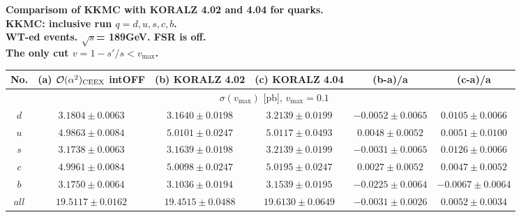 \documentclass[12pt,dvips]{article}
\begin{document}
\pagestyle{empty}
  
 
\noindent
{\Large\bf\color{red}
Comparisom of {\cal KK}MC with KORALZ 4.02 and 4.04 for quarks.}\\
{\large\bf\color{blue}
{\cal KK}MC: inclusive run $q=d,u,s,c,b$. \\
WT-ed events. $\sqrt{s}$= 189GeV. FSR is off.\\
The only cut $v=1-s'/s<v_{\max}$.
}
\vspace{10mm}

{\scriptsize
\noindent
\begin{tabular}                                                                                          {||c|c|c|c|c|c||}
\hline\hline
{\color{blue} No.}                                                              &
{\color{blue} (a) ${\cal O}(\alpha^2)_{\rm CEEX}$ intOFF}                       &
{\color{blue} (b) KORALZ 4.02 }                                                 &
{\color{blue} (c) KORALZ 4.04 }                                                 &
{\color{blue} (b-a)/a }                                                         &
{\color{blue} (c-a)/a }                                                         
\\
\hline
& \multicolumn{ 5}{c||}{
     {\color{red}$\sigma(v_{\max})$ [pb], $v_{\max}=0.1$ }                            }
\\
\hline
$  d$ & $    3.1804\pm  0.0063$ & $    3.1640\pm  0.0198$ & $    3.2139\pm  0.0199$ & $   -0.0052\pm  0.0065$ & $    0.0105\pm  0.0066$
\\
$  u$ & $    4.9863\pm  0.0084$ & $    5.0101\pm  0.0247$ & $    5.0117\pm  0.0493$ & $    0.0048\pm  0.0052$ & $    0.0051\pm  0.0100$
\\
$  s$ & $    3.1738\pm  0.0063$ & $    3.1639\pm  0.0198$ & $    3.2139\pm  0.0199$ & $   -0.0031\pm  0.0065$ & $    0.0126\pm  0.0066$
\\
$  c$ & $    4.9961\pm  0.0084$ & $    5.0098\pm  0.0247$ & $    5.0195\pm  0.0247$ & $    0.0027\pm  0.0052$ & $    0.0047\pm  0.0052$
\\
$  b$ & $    3.1750\pm  0.0064$ & $    3.1036\pm  0.0194$ & $    3.1539\pm  0.0195$ & $   -0.0225\pm  0.0064$ & $   -0.0067\pm  0.0064$
\\
\hline
$all$ & $   19.5117\pm  0.0162$ & $   19.4515\pm  0.0488$ & $   19.6130\pm  0.0649$ & $   -0.0031\pm  0.0026$ & $    0.0052\pm  0.0034$
\\
\hline

\end{tabular}}
\end{document}
